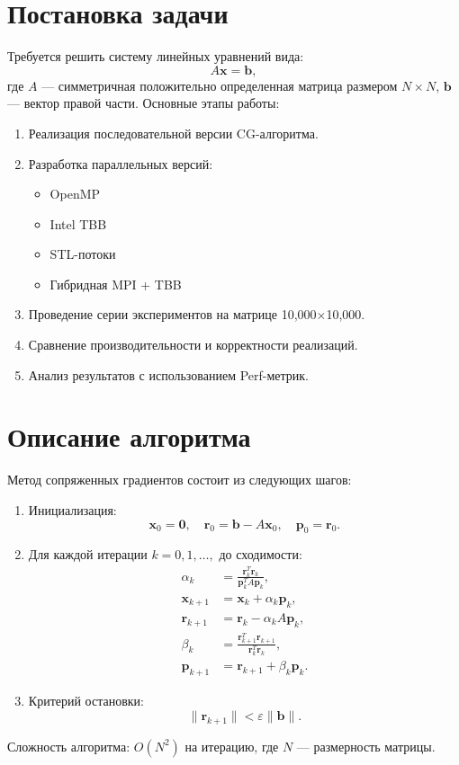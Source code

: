 \documentclass[12pt]{article}
\begin{document}
\section{Постановка задачи}

Требуется решить систему линейных уравнений вида:
\[
A\mathbf{x} = \mathbf{b},
\]
где \(A\) — симметричная положительно определенная матрица размером \(N \times N\), \(\mathbf{b}\) — вектор правой части. Основные этапы работы:
\begin{enumerate}
    \item Реализация последовательной версии CG-алгоритма.
    \item Разработка параллельных версий:
    \begin{itemize}
        \item OpenMP
        \item Intel TBB
        \item STL-потоки
        \item Гибридная MPI + TBB
    \end{itemize}
    \item Проведение серии экспериментов на матрице 10,000×10,000.
    \item Сравнение производительности и корректности реализаций.
    \item Анализ результатов с использованием Perf-метрик.
\end{enumerate}

\section{Описание алгоритма}

Метод сопряженных градиентов состоит из следующих шагов:
\begin{enumerate}
    \item Инициализация:
    \[
    \mathbf{x}_0 = \mathbf{0}, \quad 
    \mathbf{r}_0 = \mathbf{b} - A\mathbf{x}_0, \quad 
    \mathbf{p}_0 = \mathbf{r}_0.
    \]
    
    \item Для каждой итерации \(k = 0, 1, \dots,\) до сходимости:
    \begin{align*}
        \alpha_k &= \frac{\mathbf{r}_k^T \mathbf{r}_k}{\mathbf{p}_k^T A \mathbf{p}_k}, \\
        \mathbf{x}_{k+1} &= \mathbf{x}_k + \alpha_k \mathbf{p}_k, \\
        \mathbf{r}_{k+1} &= \mathbf{r}_k - \alpha_k A \mathbf{p}_k, \\
        \beta_k &= \frac{\mathbf{r}_{k+1}^T \mathbf{r}_{k+1}}{\mathbf{r}_k^T \mathbf{r}_k}, \\
        \mathbf{p}_{k+1} &= \mathbf{r}_{k+1} + \beta_k \mathbf{p}_k.
    \end{align*}
    
    \item Критерий остановки: 
    \[
    \|\mathbf{r}_{k+1}\| < \varepsilon \|\mathbf{b}\|.
    \]
\end{enumerate}
Сложность алгоритма: \(O(N^2)\) на итерацию, где \(N\) — размерность матрицы.
\end{document}
